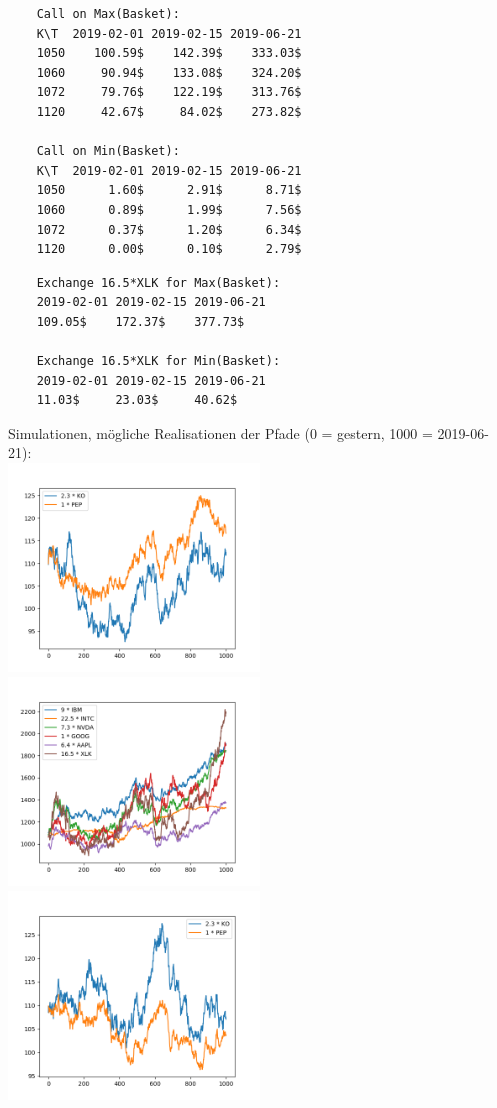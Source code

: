 \documentclass[12pt]{article}
\begin{document}
	\begin{verbatim}
	Call on Max(Basket):
	K\T  2019-02-01 2019-02-15 2019-06-21
	1050    100.59$    142.39$    333.03$ 
	1060     90.94$    133.08$    324.20$ 
	1072     79.76$    122.19$    313.76$ 
	1120     42.67$     84.02$    273.82$ 
	
	Call on Min(Basket):
	K\T  2019-02-01 2019-02-15 2019-06-21
	1050      1.60$      2.91$      8.71$ 
	1060      0.89$      1.99$      7.56$ 
	1072      0.37$      1.20$      6.34$ 
	1120      0.00$      0.10$      2.79$ 
	\end{verbatim}
	\begin{verbatim}
	Exchange 16.5*XLK for Max(Basket):
	2019-02-01 2019-02-15 2019-06-21
	109.05$    172.37$    377.73$ 
	
	Exchange 16.5*XLK for Min(Basket):
	2019-02-01 2019-02-15 2019-06-21
	11.03$     23.03$     40.62$ 
	\end{verbatim}
	Simulationen, mögliche Realisationen der Pfade (0 = gestern, 1000 =  2019-06-21):
	\\
	\includegraphics[width=0.5\textwidth]{Teil1_1}	
	\includegraphics[width=0.5\textwidth]{Teil2_1}
	\includegraphics[width=0.5\textwidth]{Teil1_2}	
\end{document}
